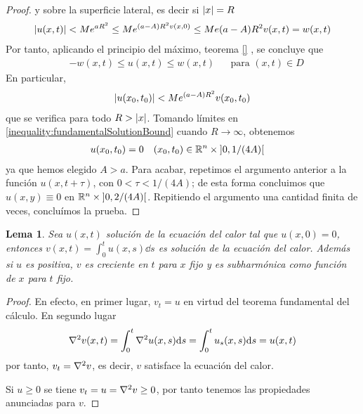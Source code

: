\documentclass{article}
\newcommand{\realNumbers}{\mathbb{R}}
\newtheorem{lemma}{Lema}
\theoremstyle{definition}
\theoremstyle{remark}
\newcommand{\leftOpenInterval}{\left]}
\newcommand{\rightOpenInterval}{\right[}
\newcommand{\leftClosedInterval}{\left[}
\newcommand{\rightClosedInterval}{\right]}
\newcommand{\interval}[3]{%
  \ifstrequal{#1}{oo}{%
    \leftOpenInterval #2, #3 \rightOpenInterval%
  }{%
    \ifstrequal{#1}{co}{%
      \leftClosedInterval #2, #3 \rightOpenInterval%
    }{%
      \ifstrequal{#1}{oc}{
        \leftOpenInterval #2, #3 \rightClosedInterval%
      }{%
        \ifstrequal{#1}{cc}{
          \leftClosedInterval #2, #3 \rightClosedInterval
        }{%
        }%
      }%
    }%
  }%
}
\begin{document}
\begin{proof}
    y sobre la superficie lateral, es decir si \(\abs{x} = R\)
    \begin{align}
      \abs{u(x, t)}
      <
      M e^{a R^2}
      \leq
      M e^{(a - A) R^2 v(x, 0)}
      \leq
      M e {(a - A) R^2} v(x, t)
      =
      w(x, t)
    \end{align}
    Por tanto, aplicando el principio del máximo, teorema 
    \ref{}  %
    , se concluye que
    \begin{align}
      &- w(x, t) \leq u(x, t) \leq w(x, t)
      && \text{para } (x, t) \in D
    \end{align}
    En particular,
    \begin{align}
      \label{inequality:fundamentalSolutionBound}
      \abs{u(x_0, t_0)}
      <
      M e^{(a - A) R^2} v(x_0, t_0)
    \end{align}
    que se verifica para todo \(R > \abs{x}\).
    Tomando límites en \ref{inequality:fundamentalSolutionBound} cuando \(R \rightarrow \infty\), obtenemos
    \begin{align}
      &u(x_0, t_0) = 0
      && (x_0, t_0) \in \realNumbers^n \times \interval{oo}{0}{1 / (4 A)}
    \end{align}
    ya que hemos elegido \(A > a\).
    Para acabar, repetimos el argumento anterior a la función \(u(x, t + \tau)\), con \(0 < \tau < 1 / (4 A)\);
    de esta forma concluimos que \(u(x, y) \equiv 0\) en \(\realNumbers^n \times \interval{oo}{0}{ 2 / (4 A)}\).
    Repitiendo el argumento una cantidad finita de veces, concluímos la prueba.
  \end{proof}

  \begin{lemma} %
    Sea \(u(x, t)\) solución de la ecuación del calor tal que \(u(x,0) = 0\), entonces \(v(x, t) = \int_0^t u(x, s) \dd s\) es solución de la ecuación del calor.
    Además si \(u\) es positiva, \(v\) es creciente en \(t\) para \(x\) fijo y es subharmónica como función de \(x\) para \(t\) fijo.
  \end{lemma}
  \begin{proof}
    En efecto, en primer lugar, \(v_t = u\) en virtud del teorema fundamental del cálculo.
    En segundo lugar
    \begin{align}
      \laplacian v (x , t)
      =
      \int_0^t \laplacian u (x, s) \dd s
      =
      \int_0^t u_s(x, s) \dd s
      =
      u(x, t)
    \end{align}
    por tanto, \(v_t = \laplacian v\), es decir, \(v\) satisface la ecuación del calor.

    Si \(u \geq 0\) se tiene \(v_t = u = \laplacian v \geq 0\), por tanto tenemos las propiedades anunciadas para \(v\).
  \end{proof}
\end{document}
